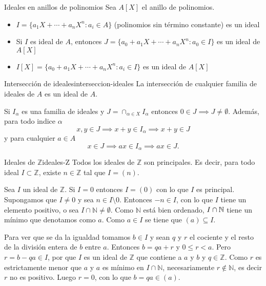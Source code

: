 \begin{example}{Ideales en anillos de polinomios}{}
    Sea \(A[X]\) el anillo de polinomios.
    \begin{itemize}
        \item \(I = \{a_1X + \cdots + a_nX^n : a_i \in A\}\) (polinomios sin término constante) es un ideal
        \item Si \(I\) es ideal de \(A\), entonces \(J = \{a_0 + a_1X + \cdots + a_nX^n : a_0 \in I\}\) es un ideal de \(A[X]\)
        \item \(I[X] = \{a_0 + a_1X + \cdots + a_nX^n : a_i \in I\}\) es un ideal de \(A[X]\)
    \end{itemize}
\end{example}

\begin{proposition}{Intersección de ideales}{interseccion-ideales}
    La intersección de cualquier familia de ideales de \(A\) es un ideal de \(A\).
\end{proposition}

\begin{proofbox}
    Si $I_\alpha$ es una familia de ideales y $J = \cap_{\alpha \in X} I_\alpha$ entonces $0 \in J \implies J \neq \emptyset$. Además, para todo indice $\alpha$
    \[
    x,y \in J \implies x+y \in I_\alpha \implies x+y \in J
    \]
    y para cualquier $a \in A$
    \[
    x \in J \implies ax \in I_\alpha \implies ax \in J.
    \]
\end{proofbox}

\begin{proposition}{Ideales de \(\mathbb{Z}\)}{ideales-Z}
    Todos los ideales de \(\mathbb{Z}\) son principales. Es decir, para todo ideal \(I \subset \mathbb{Z}\), existe \(n \in \mathbb{Z}\) tal que \(I = (n)\).
\end{proposition}

\begin{proofbox}
    Sea \(I\) un ideal de \(\mathbb{Z}\). Si \(I=0\) entonces \(I=(0)\) con lo que \(I\) es principal. Supongamos que \(I\neq 0\) y sea \(n\in I\setminus 0\). Entonces \(-n\in I\), con lo que \(I\) tiene un elemento positivo, o sea \(I\cap\mathbb{N}\neq\emptyset\). Como \(\mathbb{N}\) está bien ordenado, \(I \cap \mathbb{N}\) tiene un mínimo que denotamos como \(a\). Como \(a\in I\) se tiene que \((a)\subseteq I\).
    
    Para ver que se da la igualdad tomamos \(b\in I\) y sean \(q\) y \(r\) el cociente y el resto de la división entera de \(b\) entre \(a\). Entonces \(b=qa+r\) y \(0\leq r<a\). Pero \(r=b-qa\in I\), por que \(I\) es un ideal de \(\mathbb{Z}\) que contiene a \(a\) y \(b\) y \(q\in\mathbb{Z}\). Como \(r\) es estrictamente menor que \(a\) y \(a\) es mínimo en \(I\cap\mathbb{N}\), necesariamente \(r\not\in\mathbb{N}\), es decir \(r\) no es positivo. Luego \(r=0\), con lo que \(b=qa\in(a)\).
\end{proofbox}


